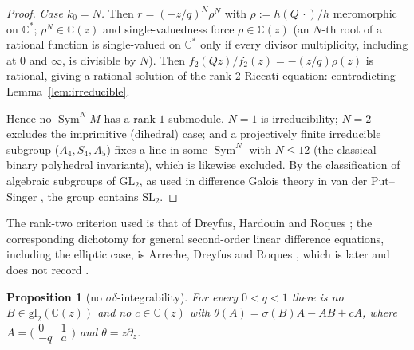 \documentclass[11pt]{article}
\theoremstyle{plain}
\newtheorem{proposition}[theorem]{Proposition}
\theoremstyle{definition}
\theoremstyle{remark}
\newcommand{\C}{\mathbb{C}}
\begin{document}
\begin{proof}
\emph{Case $k_0=N$.} Then $r=(-z/q)^N\rho^N$ with $\rho:=h(Q\,\cdot)/h$ meromorphic on $\C^*$;
$\rho^N\in\C(z)$ and single-valuedness force $\rho\in\C(z)$ (an $N$-th root of a rational function
is single-valued on $\C^*$ only if every divisor multiplicity, including at $0$ and $\infty$, is
divisible by $N$). Then $f_2(Qz)/f_2(z)=-(z/q)\rho(z)$ is rational, giving a rational solution of
the rank-$2$ Riccati equation: contradicting Lemma~\ref{lem:irreducible}.

Hence no $\operatorname{Sym}^N\!M$ has a rank-$1$ submodule. $N=1$ is irreducibility; $N=2$
excludes the imprimitive (dihedral) case; and a projectively finite irreducible subgroup
($A_4,S_4,A_5$) fixes a line in some $\operatorname{Sym}^N$ with $N\le12$ (the classical binary
polyhedral invariants), which is likewise excluded. By the classification of algebraic subgroups of
$\mathrm{GL}_2$, as used in difference Galois theory in van der Put--Singer
\cite[Ch.~1]{vdPS}, the group contains $\mathrm{SL}_2$.
\end{proof}

The rank-two criterion used is that of Dreyfus, Hardouin and Roques
\cite[Prop.~2.9]{DHR2018}; the corresponding dichotomy for general second-order linear difference
equations, including the elliptic case, is Arreche, Dreyfus and Roques \cite{ADR}, which is later
and does not record \cite{DHR2018}.

\begin{proposition}[no $\sigma\delta$-integrability]
\label{prop:nonintegrable}
For every $0<q<1$ there is no $B\in\mathrm{gl}_2(\C(z))$ and no $c\in\C(z)$ with
$\theta(A)=\sigma(B)A-AB+cA$, where $A=\bigl(\begin{smallmatrix}0&1\\-q&a\end{smallmatrix}\bigr)$ and
$\theta=z\partial_z$.
\end{proposition}
\end{document}
